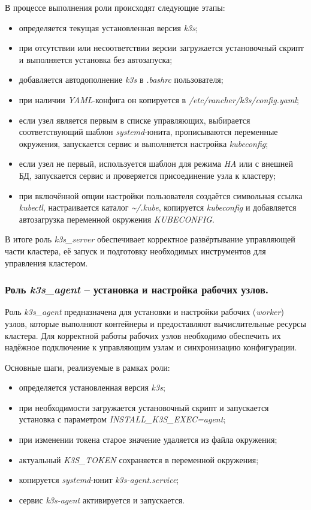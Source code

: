 В процессе выполнения роли происходят следующие этапы:
\begin{itemize}
  \item определяется текущая установленная версия \textit{k3s};
  \item при отсутствии или несоответствии версии загружается установочный скрипт и выполняется установка без автозапуска;
  \item добавляется автодополнение \textit{k3s} в \textit{.bashrc} пользователя;
  \item при наличии \textit{YAML}-конфига он копируется в \textit{/etc/rancher/k3s/config.yaml};
  \item если узел является первым в списке управляющих, выбирается соответствующий шаблон \textit{systemd}-юнита, прописываются переменные окружения, запускается сервис и выполняется настройка \textit{kubeconfig};
  \item если узел не первый, используется шаблон для режима \textit{HA} или с внешней БД, запускается сервис и проверяется присоединение узла к кластеру;
  \item при включённой опции настройки пользователя создаётся символьная ссылка \textit{kubectl}, настраивается каталог \textit{\textasciitilde/.kube}, копируется \textit{kubeconfig} и добавляется автозагрузка переменной окружения \textit{KUBECONFIG}.
\end{itemize}

В итоге роль \textit{k3s\_server} обеспечивает корректное развёртывание управляющей части кластера, её запуск и подготовку необходимых инструментов для управления кластером.

\subsubsection{Роль \textit{k3s\_agent} -- установка и настройка рабочих узлов.}
Роль \textit{k3s\_agent} предназначена для установки и настройки рабочих (\textit{worker}) узлов, которые выполняют контейнеры и предоставляют вычислительные ресурсы кластера. Для корректной работы рабочих узлов необходимо обеспечить их надёжное подключение к управляющим узлам и синхронизацию конфигурации.

Основные шаги, реализуемые в рамках роли:
\begin{itemize}
  \item определяется установленная версия \textit{k3s};
  \item при необходимости загружается установочный скрипт и запускается установка с параметром \textit{INSTALL\_K3S\_EXEC=agent};
  \item при изменении токена старое значение удаляется из файла окружения;
  \item актуальный \textit{K3S\_TOKEN} сохраняется в переменной окружения;
  \item копируется \textit{systemd}-юнит \textit{k3s-agent.service};
  \item сервис \textit{k3s-agent} активируется и запускается.
\end{itemize}

